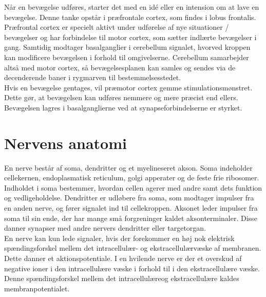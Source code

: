 Når en bevægelse udføres, starter det med en idé eller en intension om at lave en bevægelse. Denne tanke opstår i præfrontale cortex, som findes i lobus frontalis. Præfrontal cortex er specielt aktivt under udførelse af nye situationer / bevægelser og har forbindelse til motor cortex, som sætter indlærte bevægelser i gang. Samtidig modtager basalganglier i cerebellum signalet, hvorved kroppen kan modificere bevægelsen i forhold til omgivelserne. Cerebellum samarbejder altså med motor cortex, så bevægelsesplanen kan samles og sendes via de decenderende baner i rygmarven til bestemmelsesstedet. \cite{Bojsen-Moeller2012} \\
Hvis en bevægelse gentages, vil præmotor cortex gemme stimulationsmønstret. Dette gør, at bevægelsen kan udføres nemmere og mere præcist end ellers. Bevægelsen lagres i basalganglierne ved at synapseforbindelserne er styrket. \cite{Martini2012}

\section{Nervens anatomi}
En nerve består af soma, dendritter og et myelineseret akson. Soma indeholder cellekernen, endoplasmatisk reticulum, golgi apperater og de feste frie ribosomer. Indholdet i soma bestemmer, hvordan cellen agerer med andre samt dets funktion og vedligeholdelse. Dendritter er udløbere fra soma, som modtager impulser fra en anden nerve, og fører signalet ind til cellekroppen. Aksonet leder impulser fra soma til sin ende, der har mange små forgreninger kaldet aksonterminaler. Disse danner synapser med andre nervers dendritter eller targetorgan. \cite{Stanfield2014} \\
En nerve kan kun lede signaler, hvis der forekommer en høj nok elektrisk spændingsforskel mellem det intracellulær- og ekstracellulærvæske af membranen. Dette danner et aktionspotentiale. I en hvilende nerve er der et overskud af negative ioner i den intracellulære væske i forhold til i den ekstracellulære væske. Denne spændingsforskel mellem det intracellulæreog ekstracellulære kaldes membranpotentialet. \cite{Martini2012,Stanfield2014}

